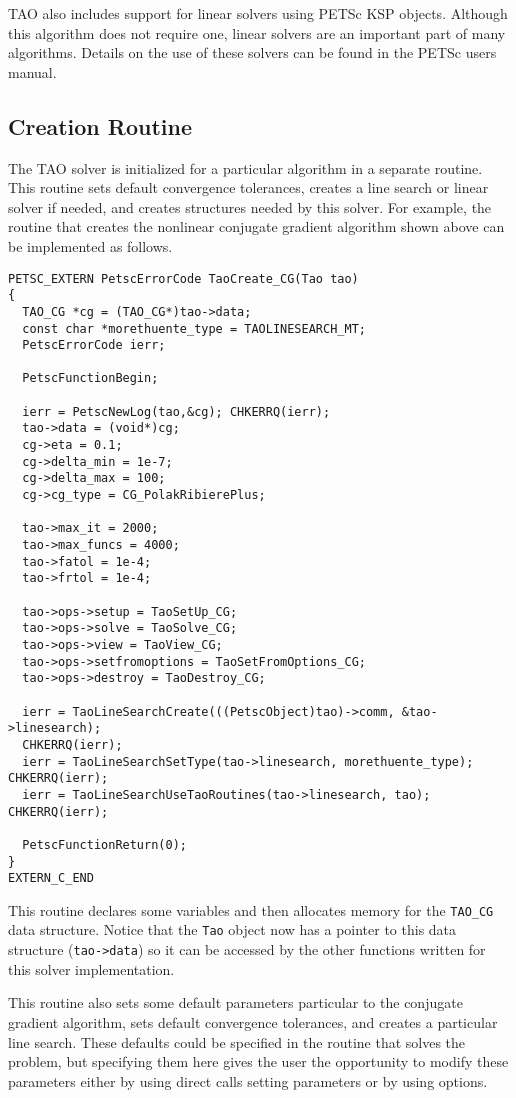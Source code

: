 TAO also includes support for linear solvers using PETSc KSP objects.  
Although this algorithm
does not require one, linear solvers are an important part of many
algorithms.  Details on the use of these solvers can be found in
the PETSc users manual.

\subsection{Creation Routine}
The TAO solver is initialized for a particular algorithm in a separate
routine.  This routine sets default convergence tolerances, creates a
line search or linear solver if needed, and creates structures needed
by this solver.   For example, the routine that creates the nonlinear
conjugate gradient algorithm shown above can be implemented as follows.

\begin{verbatim}
PETSC_EXTERN PetscErrorCode TaoCreate_CG(Tao tao)
{
  TAO_CG *cg = (TAO_CG*)tao->data;
  const char *morethuente_type = TAOLINESEARCH_MT;
  PetscErrorCode ierr;

  PetscFunctionBegin;

  ierr = PetscNewLog(tao,&cg); CHKERRQ(ierr);
  tao->data = (void*)cg;
  cg->eta = 0.1;
  cg->delta_min = 1e-7;
  cg->delta_max = 100;
  cg->cg_type = CG_PolakRibierePlus;

  tao->max_it = 2000;
  tao->max_funcs = 4000;
  tao->fatol = 1e-4;
  tao->frtol = 1e-4;

  tao->ops->setup = TaoSetUp_CG;
  tao->ops->solve = TaoSolve_CG;
  tao->ops->view = TaoView_CG;
  tao->ops->setfromoptions = TaoSetFromOptions_CG;
  tao->ops->destroy = TaoDestroy_CG;

  ierr = TaoLineSearchCreate(((PetscObject)tao)->comm, &tao->linesearch);
  CHKERRQ(ierr);
  ierr = TaoLineSearchSetType(tao->linesearch, morethuente_type); CHKERRQ(ierr);
  ierr = TaoLineSearchUseTaoRoutines(tao->linesearch, tao); CHKERRQ(ierr);

  PetscFunctionReturn(0);
}
EXTERN_C_END
\end{verbatim}

\noindent This routine declares some variables and then allocates memory for the 
{\tt TAO\_CG} data structure. Notice that the \texttt{Tao} object 
now has a pointer to this data structure (\texttt{tao->data}) so it can be 
accessed by the other functions written for this solver implementation.

This routine also sets some default parameters particular to the conjugate
gradient algorithm, sets default convergence tolerances, and creates
a particular line search.
These defaults could be specified in the routine that solves the problem,
but specifying them here gives the user the opportunity to modify these
parameters either by using direct calls setting parameters or by using options.

